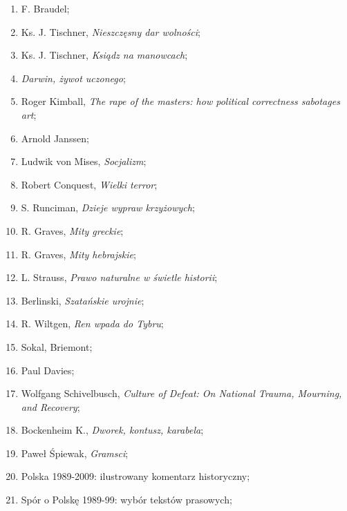 \documentclass[a4paper,11pt]{article}
\begin{document}
\begin{enumerate}
\item F. Braudel;

\item Ks. J. Tischner, \textit{Nieszczęsny dar wolności};

\item Ks. J. Tischner, \textit{Ksiądz na manowcach};

\item \textit{Darwin, żywot uczonego};

\item Roger Kimball, \textit{The rape of the masters: how political
    correctness sabotages art};

\item Arnold Janssen;

\item Ludwik von Mises, \textit{Socjalizm};

\item Robert Conquest, \textit{Wielki terror};

\item S. Runciman, \textit{Dzieje wypraw krzyżowych};

\item R. Graves, \textit{Mity greckie};

\item R. Graves, \textit{Mity hebrajskie};

\item L. Strauss, \textit{Prawo naturalne w świetle historii};

\item Berlinski, \textit{Szatańskie urojnie};

\item R. Wiltgen, \textit{Ren wpada do Tybru};

\item Sokal, Briemont;

\item Paul Davies;

\item Wolfgang Schivelbusch, \textit{Culture of Defeat: On National
    Trauma, Mourning, and Recovery};

\item Bockenheim K., \textit{Dworek, kontusz, karabela};

\item Paweł Śpiewak, \textit{Gramsci};

\item Polska 1989-2009: ilustrowany komentarz historyczny;

\item Spór o Polskę 1989-99: wybór tekstów prasowych;


\end{enumerate}
\end{document}

